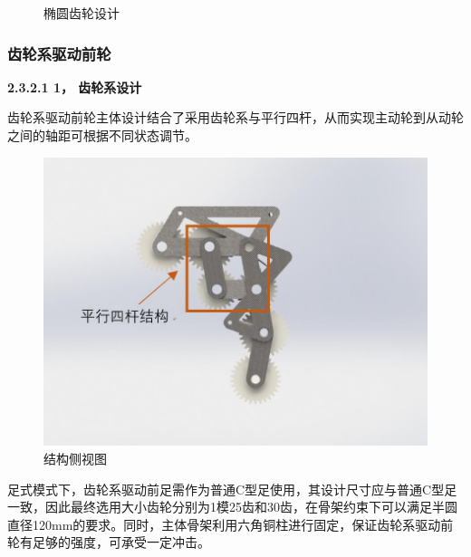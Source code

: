 \documentclass[12pt]{article}
\begin{document}
\begin{CJK}{UTF8}{gbsn}
\begin{figure}[H]
{%
}
\quad
{}
\quad
\caption{椭圆齿轮设计}
\end{figure}
\subsubsection{齿轮系驱动前轮}
\textbf{2.3.2.1 1，	齿轮系设计}\par
 齿轮系驱动前轮主体设计结合了采用齿轮系与平行四杆，从而实现主动轮到从动轮之间的轴距可根据不同状态调节。
 \begin{figure}[H]
\centering
\includegraphics[width=.6\textwidth]{chap2//figc.jpg}
\caption{结构侧视图}
\end{figure}
足式模式下，齿轮系驱动前足需作为普通C型足使用，其设计尺寸应与普通C型足一致，因此最终选用大小齿轮分别为1模25齿和30齿，在骨架约束下可以满足半圆直径120mm的要求。同时，主体骨架利用六角铜柱进行固定，保证齿轮系驱动前轮有足够的强度，可承受一定冲击。
 \begin{figure}[H]
{}
\end{figure}
\end{CJK}
\end{document}
